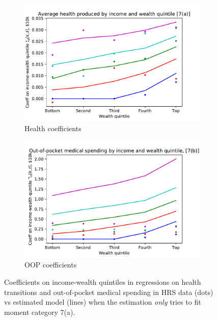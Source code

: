 \documentclass[12pt,pdftex,letterpaper]{article}
\begin{document}
\begin{figure}[h!]
	\centering
	\begin{subfigure}[b]{0.45\textwidth}
		\centering
		\includegraphics[width=\textwidth]{../Figures/HealthCoeffByIncWealthOnly7a.pdf}
		\caption{Health coefficients}
	\end{subfigure}
	\begin{subfigure}[b]{0.45\textwidth}
		\centering
		\includegraphics[width=\textwidth]{../Figures/OOPcoeffByIncWealthOnly7a.pdf}
		\caption{OOP coefficients}
	\end{subfigure}
	\caption{Coefficients on income-wealth quintiles in regressions on health transitions and out-of-pocket medical spending in HRS data (dots) vs estimated model (lines) when the estimation \textit{only} tries to fit moment category 7(a).}
	\label{fig:MomentCat7X}
\end{figure}
\end{document}
